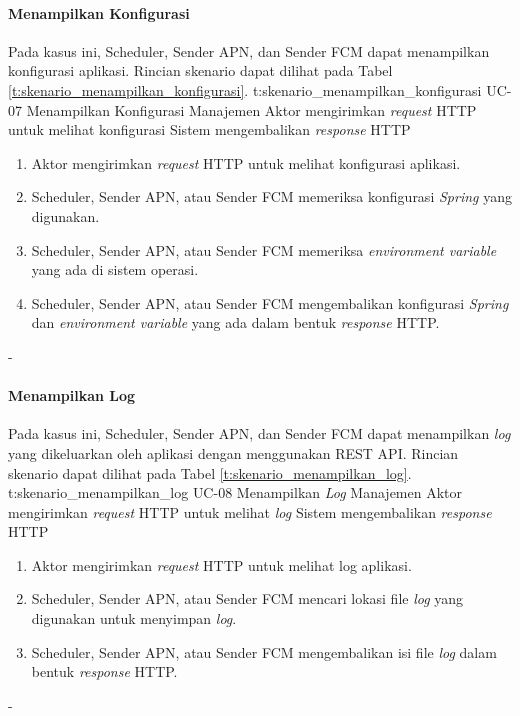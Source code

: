 \paragraph{Menampilkan Konfigurasi}
\par Pada kasus ini, Scheduler, Sender APN, dan Sender FCM dapat menampilkan konfigurasi aplikasi. Rincian skenario dapat dilihat pada Tabel \ref{t:skenario_menampilkan_konfigurasi}.
\tableUcDesc
{t:skenario_menampilkan_konfigurasi}
{UC-07}
{Menampilkan Konfigurasi}
{Manajemen}
{Aktor mengirimkan \textit{request} HTTP untuk melihat konfigurasi}
{Sistem mengembalikan \textit{response} HTTP}
{
	\begin{enumerate}
		\item Aktor mengirimkan \textit{request} HTTP untuk melihat konfigurasi aplikasi.
		\item Scheduler, Sender APN, atau Sender FCM memeriksa konfigurasi \textit{Spring} yang digunakan.
		\item Scheduler, Sender APN, atau Sender FCM memeriksa \textit{environment variable} yang ada di sistem operasi.
		\item Scheduler, Sender APN, atau Sender FCM mengembalikan konfigurasi \textit{Spring} dan \textit{environment variable} yang ada dalam bentuk \textit{response} HTTP.
	\end{enumerate}
}
{-}

\paragraph{Menampilkan Log}
\par Pada kasus ini, Scheduler, Sender APN, dan Sender FCM dapat menampilkan \textit{log} yang dikeluarkan oleh aplikasi dengan menggunakan REST API. Rincian skenario dapat dilihat pada Tabel \ref{t:skenario_menampilkan_log}.
\tableUcDesc
{t:skenario_menampilkan_log}
{UC-08}
{Menampilkan \textit{Log}}
{Manajemen}
{Aktor mengirimkan \textit{request} HTTP untuk melihat \textit{log}}
{Sistem mengembalikan \textit{response} HTTP}
{
\begin{enumerate}
	\item Aktor mengirimkan \textit{request} HTTP untuk melihat log aplikasi.
	\item Scheduler, Sender APN, atau Sender FCM mencari lokasi file \textit{log} yang digunakan untuk menyimpan \textit{log}.
	\item Scheduler, Sender APN, atau Sender FCM mengembalikan isi file \textit{log} dalam bentuk \textit{response} HTTP.
\end{enumerate}
}
{-}

